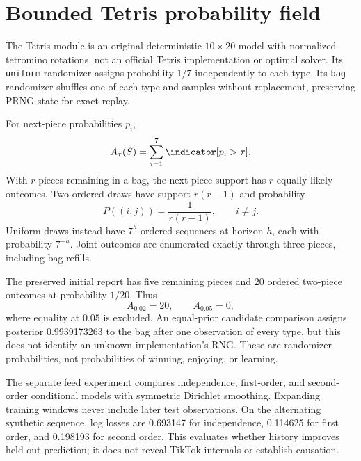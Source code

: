\section{Bounded Tetris probability field}
The Tetris module is an original deterministic $10\times20$ model with normalized tetromino rotations, not an official Tetris implementation or optimal solver. Its \texttt{uniform} randomizer assigns probability $1/7$ independently to each type. Its \texttt{bag} randomizer shuffles one of each type and samples without replacement, preserving PRNG state for exact replay.

For next-piece probabilities $p_i$,
\begin{equation}
A_\tau(S)=\sum_{i=1}^{7}\indicator[p_i>\tau].
\end{equation}
With $r$ pieces remaining in a bag, the next-piece support has $r$ equally likely outcomes. Two ordered draws have support $r(r-1)$ and probability
\begin{equation}
P((i,j))=\frac{1}{r(r-1)},\qquad i\neq j.
\end{equation}
Uniform draws instead have $7^h$ ordered sequences at horizon $h$, each with probability $7^{-h}$. Joint outcomes are enumerated exactly through three pieces, including bag refills.

The preserved initial report has five remaining pieces and 20 ordered two-piece outcomes at probability $1/20$. Thus
\begin{equation}
A_{0.02}=20,\qquad A_{0.05}=0,
\end{equation}
where equality at $0.05$ is excluded. An equal-prior candidate comparison assigns posterior 0.9939173263 to the bag after one observation of every type, but this does not identify an unknown implementation's RNG. These are randomizer probabilities, not probabilities of winning, enjoying, or learning.

The separate feed experiment compares independence, first-order, and second-order conditional models with symmetric Dirichlet smoothing. Expanding training windows never include later test observations. On the alternating synthetic sequence, log losses are 0.693147 for independence, 0.114625 for first order, and 0.198193 for second order. This evaluates whether history improves held-out prediction; it does not reveal TikTok internals or establish causation.

